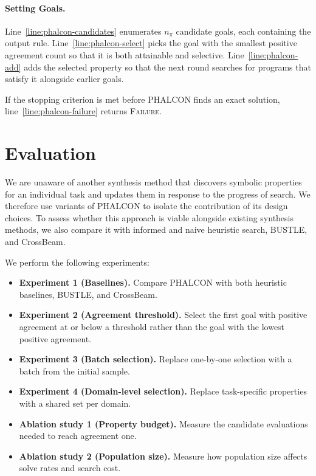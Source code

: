 \documentclass[letterpaper]{article} %
\begin{document}
\paragraph{Setting Goals.}
Line~\ref{line:phalcon-candidates} enumerates \(n_\pi\) candidate
goals, each containing the output rule.
Line~\ref{line:phalcon-select} picks the goal with the smallest
positive agreement count so that it is both attainable and selective.
Line~\ref{line:phalcon-add} adds the selected property so that the next
round searches for programs that satisfy it alongside earlier goals.

If the stopping criterion is met before PHALCON finds an exact
solution, line~\ref{line:phalcon-failure} returns \textsc{Failure}.

\section{Evaluation}
\label{sec:evaluation}

We are unaware of another synthesis method that discovers symbolic
properties for an individual task and updates them in response to the
progress of search. We therefore use variants of PHALCON to isolate the
contribution of its design choices. To assess whether this approach is
viable alongside existing synthesis methods, we also compare it with
informed and naive heuristic search, BUSTLE, and CrossBeam.

We perform the following experiments:
\begin{itemize}
  \item \textbf{Experiment 1 (Baselines).} Compare PHALCON with both
    heuristic baselines, BUSTLE, and CrossBeam.
  \item \textbf{Experiment 2 (Agreement threshold).} Select the first
    goal with positive agreement at or below a threshold rather than
    the goal with the lowest positive agreement.
  \item \textbf{Experiment 3 (Batch selection).} Replace one-by-one selection
    with a batch from the initial sample.
  \item \textbf{Experiment 4 (Domain-level selection).} Replace
    task-specific properties with a shared set per domain.
  \item \textbf{Ablation study 1 (Property budget).} Measure the
    candidate evaluations needed to reach agreement one.
  \item \textbf{Ablation study 2 (Population size).} Measure how
    population size affects solve rates and search cost.
\end{itemize}
\end{document}
